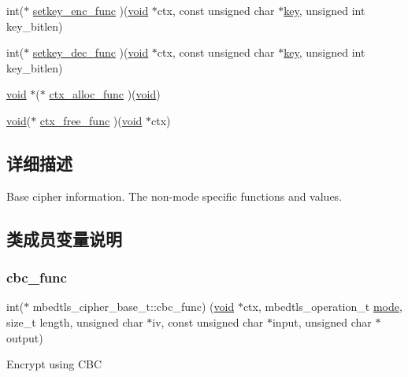 \begin{DoxyCompactItemize}
\item 
int($\ast$ \hyperlink{structmbedtls__cipher__base__t_a775aad5b31782d29bb0fd9414c366a6a}{setkey\+\_\+enc\+\_\+func} )(\hyperlink{interfacevoid}{void} $\ast$ctx, const unsigned char $\ast$\hyperlink{structkey}{key}, unsigned int key\+\_\+bitlen)
\item 
int($\ast$ \hyperlink{structmbedtls__cipher__base__t_a946b52cf0745a0d098781804a68d958c}{setkey\+\_\+dec\+\_\+func} )(\hyperlink{interfacevoid}{void} $\ast$ctx, const unsigned char $\ast$\hyperlink{structkey}{key}, unsigned int key\+\_\+bitlen)
\item 
\hyperlink{interfacevoid}{void} $\ast$($\ast$ \hyperlink{structmbedtls__cipher__base__t_a95b0567a8a1644bc9325d08f74bbca99}{ctx\+\_\+alloc\+\_\+func} )(\hyperlink{interfacevoid}{void})
\item 
\hyperlink{interfacevoid}{void}($\ast$ \hyperlink{structmbedtls__cipher__base__t_abbb84630477b19baf2831369e69965a8}{ctx\+\_\+free\+\_\+func} )(\hyperlink{interfacevoid}{void} $\ast$ctx)
\end{DoxyCompactItemize}


\subsection{详细描述}
Base cipher information. The non-\/mode specific functions and values. 

\subsection{类成员变量说明}
\mbox{\label{structmbedtls__cipher__base__t_a205924b0ffe7b35d4b74a7a4c6675ddf}} 
\subsubsection{\texorpdfstring{cbc\+\_\+func}{cbc\_func}}
{\footnotesize\ttfamily int($\ast$ mbedtls\+\_\+cipher\+\_\+base\+\_\+t\+::cbc\+\_\+func) (\hyperlink{interfacevoid}{void} $\ast$ctx, mbedtls\+\_\+operation\+\_\+t \hyperlink{interfacevoid}{mode}, size\+\_\+t length, unsigned char $\ast$iv, const unsigned char $\ast$input, unsigned char $\ast$output)}

Encrypt using C\+BC \mbox{\label{structmbedtls__cipher__base__t_a06361a67ea8a128d3a58b4f99ee6cf5f}} 
